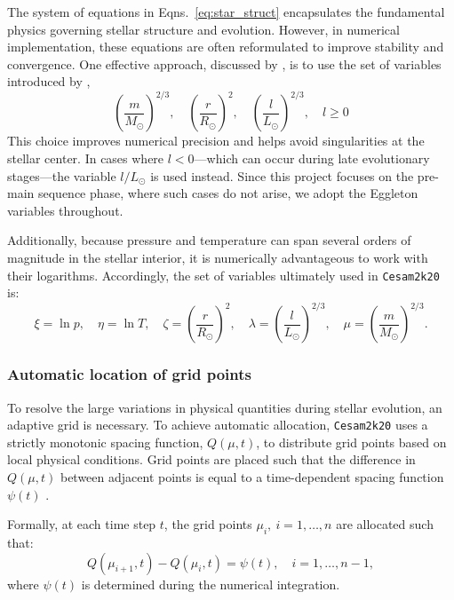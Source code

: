 \documentclass[12pt,a4paper]{article}
\begin{document}
The system of equations in Eqns.~\eqref{eq:star_struct} encapsulates the fundamental physics governing stellar structure and evolution. However, in numerical implementation, these equations are often reformulated to improve stability and convergence. One effective approach, discussed by \textcite{Morel1997}, is to use the set of variables introduced by \textcite{Eggleton1971},
\begin{equation*}
  \left(\frac{m}{M_\odot}\right)^{2/3},\quad \left(\frac{r}{R_\odot}\right)^2,\quad \left(\frac{l}{L_\odot}\right)^{2/3}, \quad l \geq 0
\end{equation*}
This choice improves numerical precision and helps avoid singularities at the stellar center. In cases where $l < 0$—which can occur during late evolutionary stages—the variable $l/L_\odot$ is used instead. Since this project focuses on the pre-main sequence phase, where such cases do not arise, we adopt the Eggleton variables throughout.

Additionally, because pressure and temperature can span several orders of magnitude in the stellar interior, it is numerically advantageous to work with their logarithms. Accordingly, the set of variables ultimately used in \texttt{Cesam2k20} is:
\begin{equation}
  \xi = \ln p,\quad \eta = \ln T,\quad \zeta = \left(\frac{r}{R_\odot}\right)^2,\quad \lambda = \left(\frac{l}{L_\odot}\right)^{2/3},\quad \mu = \left(\frac{m}{M_\odot}\right)^{2/3}. \label{eq:cesam2k20_variables}
\end{equation}

\subsubsection{Automatic location of grid points}
\label{sec:cesam2k20_grid}

To resolve the large variations in physical quantities during stellar evolution, an adaptive grid is necessary. To achieve automatic allocation, \texttt{Cesam2k20} uses a strictly monotonic spacing function, $Q(\mu, t)$, to distribute grid points based on local physical conditions. Grid points are placed such that the difference in $Q(\mu, t)$ between adjacent points is equal to a time-dependent spacing function $\psi(t)$ \parencite{Eggleton1971,PressEtAl1992,Morel1997}.

Formally, at each time step $t$, the grid points $\mu_i,\ i = 1,\ldots,n$ are allocated such that:
\begin{equation}
  Q(\mu_{i+1}, t) - Q(\mu_i, t) = \psi(t),\quad i = 1, \ldots, n-1,
\end{equation}
where $\psi(t)$ is determined during the numerical integration. 
\end{document}
